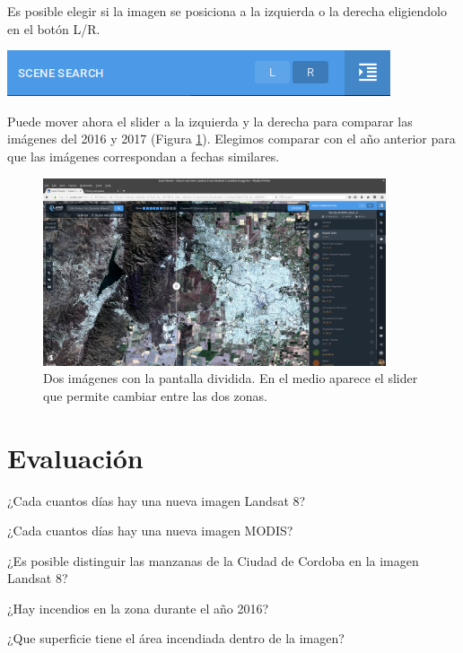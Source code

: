 \documentclass[a4paper,12pt]{book}
\begin{document}
Es posible elegir si la imagen se posiciona a la izquierda o la derecha eligiendolo en el botón L/R.

\begin{center}\includegraphics[scale=0.4]{in:LorR.png}\end{center}

Puede mover ahora el slider a la izquierda y la derecha para comparar las imágenes del 2016 y 2017 (Figura \ref{fig:slider}). Elegimos comparar con el año anterior para que las imágenes correspondan a fechas similares.

\begin{figure}[h!]
    \centering
    \includegraphics[width=0.9\textwidth]{fig:slider.png}
    \caption{Dos imágenes con la pantalla dividida. En el medio aparece el slider que permite cambiar entre las dos zonas.}
    \label{fig:slider}
\end{figure}

\section{Evaluación}
\begin{que}
    ¿Cada cuantos días hay una nueva imagen Landsat 8?
\end{que}
\begin{que}
    ¿Cada cuantos días hay una nueva imagen MODIS?
\end{que}
\begin{que}
    ¿Es posible distinguir las manzanas de la Ciudad de Cordoba en la imagen Landsat 8?
\end{que}
\begin{que}
    ¿Hay incendios en la zona durante el año 2016?
\end{que}
\begin{que}
    ¿Que superficie tiene el área incendiada dentro de la imagen?
\end{que}
\end{document}
